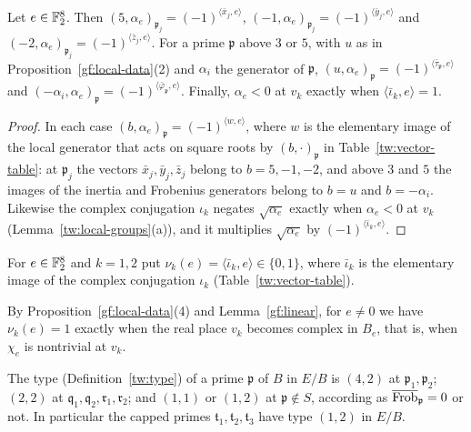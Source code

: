 \begin{lemma}\label{gf:linear}
Let $e\in\mathbb F_2^8$. Then
$(5,\alpha_e)_{\mathfrak p_j}=(-1)^{\langle\bar x_j,e\rangle}$,
$(-1,\alpha_e)_{\mathfrak p_j}=(-1)^{\langle\bar y_j,e\rangle}$ and
$(-2,\alpha_e)_{\mathfrak p_j}=(-1)^{\langle\bar z_j,e\rangle}$. For a prime
$\mathfrak p$ above $3$ or $5$, with $u$ as in
Proposition~\ref{gf:local-data}(2) and $\alpha_i$ the generator of
$\mathfrak p$,
$(u,\alpha_e)_{\mathfrak p}=(-1)^{\langle\bar\tau_{\mathfrak p},e\rangle}$ and
$(-\alpha_i,\alpha_e)_{\mathfrak p}=(-1)^{\langle\bar\varphi_{\mathfrak p},e\rangle}$.
Finally, $\alpha_e<0$ at $v_k$ exactly when $\langle\bar\iota_k,e\rangle=1$.
\end{lemma}

\begin{proof}
In each case $(b,\alpha_e)_{\mathfrak p}=(-1)^{\langle w,e\rangle}$, where $w$
is the elementary image of the local generator that acts on square roots by
$(b,\cdot)_{\mathfrak p}$ in Table~\ref{tw:vector-table}: at $\mathfrak p_j$
the vectors $\bar x_j,\bar y_j,\bar z_j$ belong to $b=5,-1,-2$, and above
$3$ and $5$ the images of the inertia and Frobenius generators belong to
$b=u$ and $b=-\alpha_i$. Likewise the complex conjugation $\iota_k$ negates
$\sqrt{\alpha_e}$ exactly when $\alpha_e<0$ at $v_k$
(Lemma~\ref{tw:local-groups}(a)), and it multiplies $\sqrt{\alpha_e}$ by
$(-1)^{\langle\bar\iota_k,e\rangle}$.
\end{proof}

\begin{definition}\label{gf:archimedean}
For $e\in\mathbb F_2^8$ and $k=1,2$ put
$\nu_k(e)=\langle\bar\iota_k,e\rangle\in\{0,1\}$, where $\bar\iota_k$ is the
elementary image of the complex conjugation $\iota_k$
(Table~\ref{tw:vector-table}).
\end{definition}

By Proposition~\ref{gf:local-data}(4) and Lemma~\ref{gf:linear}, for $e\ne0$
we have $\nu_k(e)=1$ exactly when the real place $v_k$ becomes complex in
$B_e$, that is, when $\chi_e$ is nontrivial at $v_k$.

\begin{corollary}\label{gf:types}
The type (Definition~\ref{tw:type}) of a prime $\mathfrak p$ of $B$ in
$E/B$ is $(4,2)$ at $\mathfrak p_1,\mathfrak p_2$; $(2,2)$ at
$\mathfrak q_1,\mathfrak q_2,\mathfrak r_1,\mathfrak r_2$; and $(1,1)$ or
$(1,2)$ at $\mathfrak p\notin S$, according as $\overline{\operatorname{Frob}}_{\mathfrak p}=0$
or not.
In particular the capped primes $\mathfrak t_1,\mathfrak t_2,\mathfrak t_3$
have type $(1,2)$ in $E/B$.
\end{corollary}

